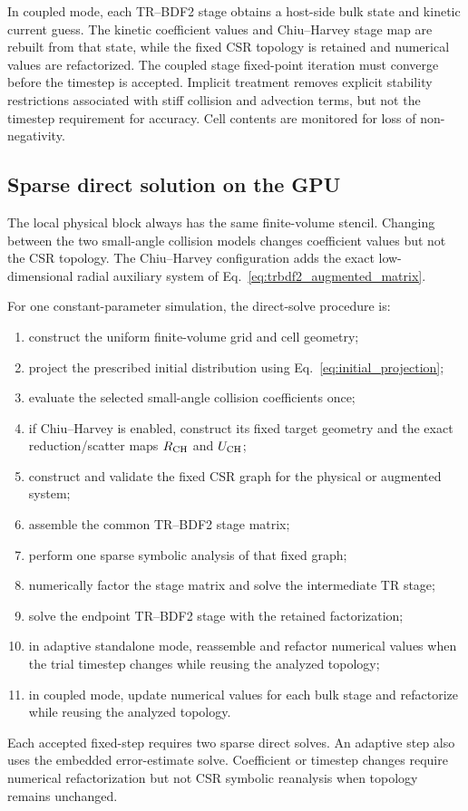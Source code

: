 \documentclass[11pt]{article}
\begin{document}
In coupled mode, each TR--BDF2 stage obtains a host-side bulk state and kinetic current
guess.  The kinetic coefficient values and Chiu--Harvey stage map are rebuilt from that
state, while the fixed CSR topology is retained and numerical values are refactorized.
The coupled stage fixed-point iteration must converge before the timestep is accepted.
Implicit treatment removes explicit stability restrictions associated with stiff collision
and advection terms, but not the timestep requirement for accuracy.  Cell contents are
monitored for loss of non-negativity.

\subsection{Sparse direct solution on the GPU}

The local physical block always has the same finite-volume stencil.  Changing between
the two small-angle collision models changes coefficient values but not the CSR topology.
The Chiu--Harvey configuration adds the exact low-dimensional radial auxiliary system of
Eq.~\eqref{eq:trbdf2_augmented_matrix}.

For one constant-parameter simulation, the direct-solve procedure is:
\begin{enumerate}
 \item construct the uniform finite-volume grid and cell geometry;
 \item project the prescribed initial distribution using Eq.~\eqref{eq:initial_projection};
 \item evaluate the selected small-angle collision coefficients once;
 \item if Chiu--Harvey is enabled, construct its fixed target geometry and the exact
       reduction/scatter maps $R_{\rm CH}$ and $U_{\rm CH}$;
 \item construct and validate the fixed CSR graph for the physical or augmented system;
 \item assemble the common TR--BDF2 stage matrix;
 \item perform one sparse symbolic analysis of that fixed graph;
 \item numerically factor the stage matrix and solve the intermediate TR stage;
 \item solve the endpoint TR--BDF2 stage with the retained factorization;
 \item in adaptive standalone mode, reassemble and refactor numerical values when the
       trial timestep changes while reusing the analyzed topology;
 \item in coupled mode, update numerical values for each bulk stage and refactorize while
       reusing the analyzed topology.
\end{enumerate}
Each accepted fixed-step requires two sparse direct solves.  An adaptive step also uses
the embedded error-estimate solve.  Coefficient or timestep changes require numerical
refactorization but not CSR symbolic reanalysis when topology remains unchanged.
\end{document}
